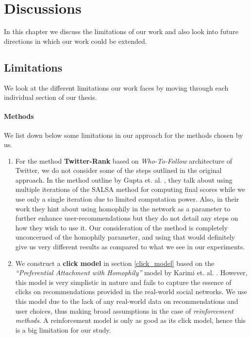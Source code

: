 \chapter{Discussions}
\label{discussions}
\thispagestyle{empty}

In this chapter we discuss the limitations of our work and also look into future directions in which our work could be extended. 

\section{Limitations}

We look at the different limitations our work faces by moving through each individual section of our thesis.

\subsubsection{Methods}
We list down below some limitations in our approach for the methods chosen by us.

\begin{enumerate}
	\item For the method \textbf{Twitter-Rank} based on \textit{Who-To-Follow} architecture of Twitter, we do not consider some of the steps outlined in the original approach. In the method outline by Gupta et. al. \cite{gupta2013wtf}, they talk about using multiple iterations of the SALSA method for computing final scores while we use only a single iteration due to limited computation power. Also, in their work they hint about using homophily in the network as a parameter to further enhance user-recommendations but they do not detail any steps on how they wish to use it. Our consideration of the method is completely unconcerned of the homophily parameter, and using that would definitely give us very different results as compared to what we see in our experiments. 
	
	\item We construct a \textbf{click model} in section \ref{click_model} based on the \textit{``Preferential Attachment with Homophily''} model by Karimi et. al. \cite{karimi2018homophily}. However, this model is very simplistic in nature and fails to capture the essence of clicks on recommendations provided in the real-world social networks. We use this model due to the lack of any real-world data on recommendations and user choices, thus making broad assumptions in the case of \textit{reinforcement methods}. A reinforcement model is only as good as its click model, hence this is a big limitation for our study.
\end{enumerate}

